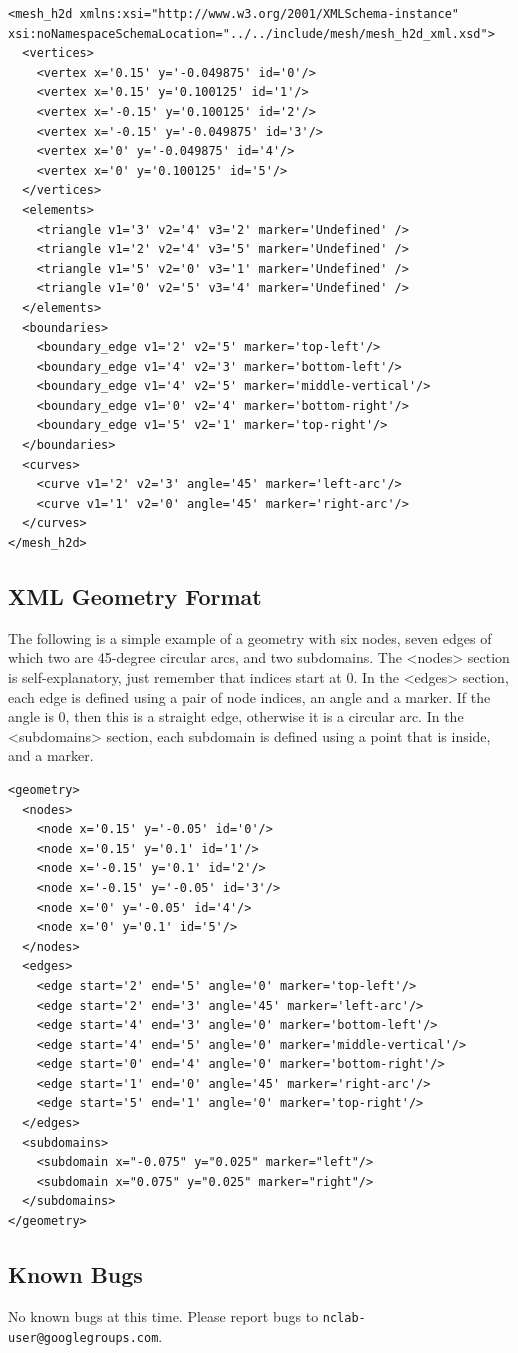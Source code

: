 \documentclass{article}
\begin{document}
\begin{verbatim}
<mesh_h2d xmlns:xsi="http://www.w3.org/2001/XMLSchema-instance" 
xsi:noNamespaceSchemaLocation="../../include/mesh/mesh_h2d_xml.xsd">
  <vertices>
    <vertex x='0.15' y='-0.049875' id='0'/>
    <vertex x='0.15' y='0.100125' id='1'/>
    <vertex x='-0.15' y='0.100125' id='2'/>
    <vertex x='-0.15' y='-0.049875' id='3'/>
    <vertex x='0' y='-0.049875' id='4'/>
    <vertex x='0' y='0.100125' id='5'/>
  </vertices>
  <elements>
    <triangle v1='3' v2='4' v3='2' marker='Undefined' />
    <triangle v1='2' v2='4' v3='5' marker='Undefined' />
    <triangle v1='5' v2='0' v3='1' marker='Undefined' />
    <triangle v1='0' v2='5' v3='4' marker='Undefined' />
  </elements>
  <boundaries>
    <boundary_edge v1='2' v2='5' marker='top-left'/>
    <boundary_edge v1='4' v2='3' marker='bottom-left'/>
    <boundary_edge v1='4' v2='5' marker='middle-vertical'/>
    <boundary_edge v1='0' v2='4' marker='bottom-right'/>
    <boundary_edge v1='5' v2='1' marker='top-right'/>
  </boundaries>
  <curves>
    <curve v1='2' v2='3' angle='45' marker='left-arc'/>
    <curve v1='1' v2='0' angle='45' marker='right-arc'/>
  </curves>
</mesh_h2d>
\end{verbatim}

\subsection*{XML Geometry Format}

The following is a simple example of a geometry with six nodes, seven edges 
of which two are 45-degree circular arcs, and two subdomains. The <nodes> 
section is self-explanatory, just remember that indices start at 0. In 
the <edges> section, each edge is defined using a pair of node indices, 
an angle and a marker. If the angle is 0, then this is a straight edge, 
otherwise it is a circular arc. In the <subdomains> section, each 
subdomain is defined using a point that is inside, and a marker.

\begin{verbatim}
<geometry>
  <nodes>
    <node x='0.15' y='-0.05' id='0'/>
    <node x='0.15' y='0.1' id='1'/>
    <node x='-0.15' y='0.1' id='2'/>
    <node x='-0.15' y='-0.05' id='3'/>
    <node x='0' y='-0.05' id='4'/>
    <node x='0' y='0.1' id='5'/>
  </nodes>
  <edges>
    <edge start='2' end='5' angle='0' marker='top-left'/>
    <edge start='2' end='3' angle='45' marker='left-arc'/>
    <edge start='4' end='3' angle='0' marker='bottom-left'/>
    <edge start='4' end='5' angle='0' marker='middle-vertical'/>
    <edge start='0' end='4' angle='0' marker='bottom-right'/>
    <edge start='1' end='0' angle='45' marker='right-arc'/>
    <edge start='5' end='1' angle='0' marker='top-right'/>
  </edges>
  <subdomains>
    <subdomain x="-0.075" y="0.025" marker="left"/>
    <subdomain x="0.075" y="0.025" marker="right"/>
  </subdomains>
</geometry>
\end{verbatim}


\subsection*{Known Bugs}

No known bugs at this time. Please report bugs to {\tt nclab-user@googlegroups.com}.
\end{document}
